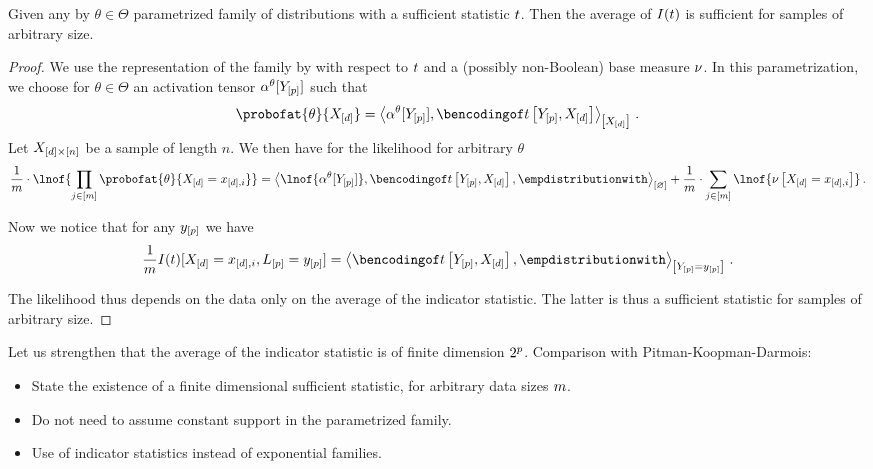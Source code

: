\documentclass[aps,onecolumn,nofootinbib,pra]{article}
\begin{document}
    \begin{theorem}
        Given any by $\theta\in\Theta$ parametrized family of distributions with a sufficient statistic $t$.
        Then the average of $I(t)$ is sufficient for samples of arbitrary size.
    \end{theorem}
    \begin{proof}
        We use the representation of the family by \ComputationActivationNetworks{} with respect to $t$ and a (possibly non-Boolean) base measure $\nu$.
        In this parametrization, we choose for $\theta\in\Theta$ an activation tensor $\alpha^{\theta}[Y_{[p]}]$ such that
        \begin{align*} %
            \probofat{\theta}{\shortcatvariables} = \contractionof{\actcoreofat{\theta}{\headvariables},\bencsstatwith}{\shortcatvariables} \, .
        \end{align*}
        Let $X_{[d]\times[n]}$ be a sample of length $n$.
        We then have for the likelihood for arbitrary $\theta$
        \begin{align*}
            \frac{1}{\datanum} \cdot \lnof{\prod_{\datindexin}\probofat{\theta}{\shortcatvariables=\catindexof{[\catorder],i}}} =
            \contraction{\lnof{\actcoreofat{\theta}{\headvariables}},\bencsstatwith,\empdistributionwith}
            + \frac{1}{\datanum} \cdot \sum_{\datindexin} \lnof{\basemeasureat{\shortcatvariables=\catindexof{[\catorder],i}}} \, .
        \end{align*}

        Now we notice that for any $y_{[p]}$ we have
        \begin{align*}
            \frac{1}{\datanum} I(\sstat)[\shortcatvariables=\catindexof{[\catorder],i},\selvariableof{[\seldim]}=\headindexof{[\seldim]}]
            = \contractionof{\bencsstatwith,\empdistributionwith}{\headvariables=\headindexof{[\seldim]}} \, .
        \end{align*}

        The likelihood thus depends on the data only on the average of the indicator statistic.
        The latter is thus a sufficient statistic for samples of arbitrary size.
    \end{proof}

    Let us strengthen that the average of the indicator statistic is of finite dimension $2^{p}$.
    Comparison with Pitman-Koopman-Darmois:
    \begin{itemize}
        \item State the existence of a finite dimensional sufficient statistic, for arbitrary data sizes $m$.
        \item Do not need to assume constant support in the parametrized family.
        \item Use \HybridLogicNetworks{} of indicator statistics instead of exponential families.
    \end{itemize}
\end{document}
